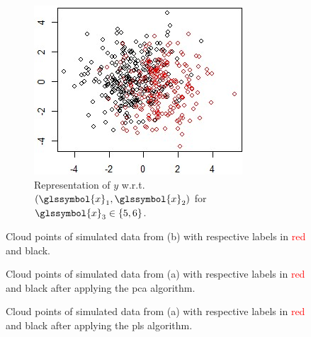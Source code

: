 \begin{figure}
\begin{subfigure}[t]{0.32\textwidth}
\label{fig:simu2}
\end{subfigure}
\begin{subfigure}[t]{0.32\textwidth}
\includegraphics[width=\textwidth]{figures/chapitre6/graph_simu_3.jpg}
\caption{Representation of $y$ w.r.t.\ $(\glssymbol{x}_1,\glssymbol{x}_2)$ for $\glssymbol{x}_3 \in \{5,6\}$.}
\label{fig:simu3}
\end{subfigure}
\caption{Cloud points of simulated data from (b) with respective labels in \textcolor{red}{red} and black.}
\label{fig:simu}
\end{figure}

\begin{figure}
\centering \resizebox{.7\textwidth}{!}{}
\caption{Cloud points of simulated data from (a) with respective labels in \textcolor{red}{red} and black after applying the \gls{pca} algorithm.}
\label{fig:simu_a_famd}
\end{figure}

\begin{figure}
\centering \resizebox{.7\textwidth}{!}{}
\caption{Cloud points of simulated data from (a) with respective labels in \textcolor{red}{red} and black after applying the \gls{pls} algorithm.}
\label{fig:simu_a_pls}
\end{figure}


